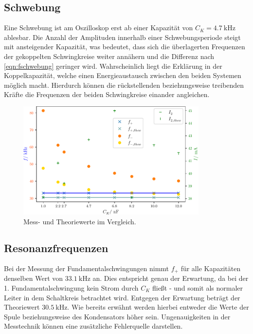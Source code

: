 \subsection{Schwebung}
Eine Schwebung ist am Oszilloskop erst ab einer Kapazität von $C_K = \SI{4.7}{\kilo\hertz}$ ablesbar. Die Anzahl der Amplituden innerhalb einer Schwebungsperiode
steigt mit ansteigender Kapazität, was bedeutet, dass sich die überlagerten Frequenzen der gekoppelten Schwingkreise weiter annähern und die Differenz nach \eqref{eqn:fschwebung} geringer wird.
Wahrscheinlich liegt die Erklärung in der Koppelkapazität, welche einen Energieaustausch zwischen den beiden Systemen möglich macht. Hierdurch können die rückstellenden 
beziehungsweise %
treibenden Kräfte
die Frequenzen der beiden Schwingkreise einander angleichen.

\begin{figure}
    \centering
    \includegraphics[width=0.85\textwidth]{plots/Messdaten_und_Theorie.pdf}
    \caption{Mess- und Theoriewerte im Vergleich.}
    \label{fig:mess_theo}
\end{figure}

\subsection{Resonanzfrequenzen}
Bei der Messung der Fundamentalschwingungen nimmt $f_+$ für alle Kapazitäten denselben Wert von $\SI{33.1}{\kilo\hertz}$ an. Dies entspricht genau der Erwartung,
da bei der 1. Fundamentalschwingung kein Strom durch $C_K$ fließt - und somit als normaler Leiter in dem Schaltkreis betrachtet wird.
Entgegen der Erwartung %
beträgt der Theoriewert $\SI{30.5}{\kilo\hertz}$. Wie bereits erwähnt werden hierbei entweder die Werte der Spule beziehungsweise des Kondensators höher sein.
Ungenauigkeiten in der Messtechnik können eine zusätzliche Fehlerquelle darstellen.

